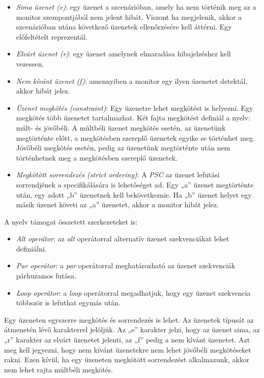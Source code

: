 \begin{itemize}
    \item \textit{Sima üzenet (e)}: egy üzenet a szcenárióban, amely ha nem történik meg az a monitor szempontjából nem jelent hibát.
    Viszont ha megjelenik, akkor a szcenárióban utána következő üzenetek ellenőrzésére kell áttérni.
    Egy előfeltételt reprezentál.
    \item \textit{Elvárt üzenet (r)}: egy üzenet amelynek elmaradása hibajelzéshez kell vezessen.
    \item \textit{Nem kívánt üzenet (f)}: amennyiben a monitor egy ilyen üzenetet detektál, akkor hibát jelez.
    \item \textit{Üzenet megkötés (constraint)}: Egy üzenetre lehet megkötést is helyezni.
    Egy megkötés több üzenetet tartalmazhat.
    Két fajta megkötést definiál a nyelv: múlt- és jövőbéli.
    A múltbéli üzenet megkötés esetén, az üzenetünk megtörténte előtt, a megkötésben szereplő üzenetek egyike se történhet meg.
    Jövőbéli megkötés esetén, pedig az üzenetünk megtörténte után nem történhetnek meg a megkötésben szereplő üzenetek.
    \item \textit{Megkötött sorrendezés (strict ordering)}: A \textit{PSC} az üzenet lefutási sorrendjének a specifikálására is lehetőséget ad.
    Egy „a” üzenet megtörténte után, egy adott „b” üzenetnek kell bekövetkeznie.
    Ha „b” üzenet helyet egy másik üzenet követi az „a” üzenetet, akkor a monitor hibát jelez.
\end{itemize}

A nyelv támogat összetett szerkezeteket is:

\begin{itemize}
    \item \textit{Alt operátor}: az \textit{alt} operátorral alternatív üzenet szekvenciákat lehet definiálni.
    \item \textit{Par operátor}: a \textit{par} operátorral meghatározható az üzenet szekvenciák párhuzamos futása.
    \item \textit{Loop operátor}: a \textit{loop} operátorral megadhatjuk, hogy egy üzenet szekvencia többször is lefuthat egymás után.
\end{itemize}

Egy üzeneten egyszerre megkötés és sorrendezés is lehet.
Az üzenetek típusát az átmenetén lévő karakterrel jelöljük.
Az „e” karakter jelzi, hogy az üzenet sima, az „r” karakter az elvárt üzenetet jelenti, az „f” pedig a nem kívánt üzenetet.
Azt meg kell jegyezni, hogy nem kívánt üzenetekre nem lehet jövőbéli megkötéseket rakni.
Ezen kívül, ha egy üzeneten megkötött sorrendezést alkalmazunk, akkor nem lehet rajta múltbéli megkötés.

